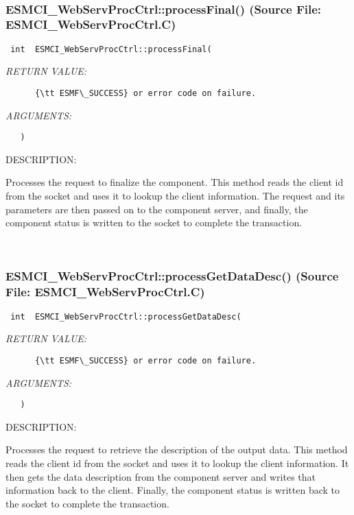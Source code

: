  
\mbox{}\hrulefill\
 
\subsubsection{ESMCI\_WebServProcCtrl::processFinal() (Source File: ESMCI\_WebServProcCtrl.C)}


  
\begin{verbatim} int  ESMCI_WebServProcCtrl::processFinal(\end{verbatim}{\em RETURN VALUE:}
\begin{verbatim}      {\tt ESMF\_SUCCESS} or error code on failure.\end{verbatim}{\em ARGUMENTS:}
\begin{verbatim}   )\end{verbatim}
{\sf DESCRIPTION:\\ }


      Processes the request to finalize the component.  This method reads the
      client id from the socket and uses it to lookup the client information.
      The request and its parameters are then passed on to the component
      server, and finally, the component status is written to the socket
      to complete the transaction.
   
 
\mbox{}\hrulefill\
 
\subsubsection{ESMCI\_WebServProcCtrl::processGetDataDesc() (Source File: ESMCI\_WebServProcCtrl.C)}


  
\begin{verbatim} int  ESMCI_WebServProcCtrl::processGetDataDesc(\end{verbatim}{\em RETURN VALUE:}
\begin{verbatim}      {\tt ESMF\_SUCCESS} or error code on failure.\end{verbatim}{\em ARGUMENTS:}
\begin{verbatim}   )\end{verbatim}
{\sf DESCRIPTION:\\ }


      Processes the request to retrieve the description of the output data.
      This method reads the client id from the socket and uses it to lookup
      the client information.  It then gets the data description from the
      component server and writes that information back to the client.
      Finally, the component status is written back to the socket to complete
      the transaction.
   
